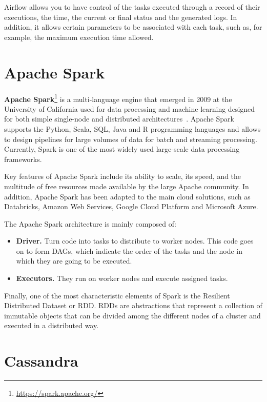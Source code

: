 \nonzeroparskip Airflow allows you to have control of the tasks executed through a record of their executions, the time, the current or final status and the generated logs. In addition, it allows certain parameters to be associated with each task, such as, for example, the maximum execution time allowed.

\section{Apache Spark}

\nonzeroparskip \textbf{Apache Spark}\footnote{\url{https://spark.apache.org/}} is a multi-language engine that emerged in 2009 at the University of California used for data processing and machine learning designed for both simple single-node and distributed architectures~\cite{infoworld_spark}. Apache Spark supports the Python, Scala, SQL, Java and R programming languages and allows to design pipelines for large volumes of data for batch and streaming processing. Currently, Spark is one of the most widely used large-scale data processing frameworks.

\nonzeroparskip Key features of Apache Spark include its ability to scale, its speed, and the multitude of free resources made available by the large Apache community. In addition, Apache Spark has been adapted to the main cloud solutions, such as Databricks, Amazon Web Services, Google Cloud Platform and Microsoft Azure.

\nonzeroparskip The Apache Spark architecture is mainly composed of:
\begin{itemize}
	\item \textbf{Driver.} Turn code into tasks to distribute to worker nodes. This code goes on to form DAGs, which indicate the order of the tasks and the node in which they are going to be executed.
	\item \textbf{Executors.} They run on worker nodes and execute assigned tasks.
\end{itemize}

\nonzeroparskip Finally, one of the most characteristic elements of Spark is the Resilient Distributed Dataset or RDD. RDDs are abstractions that represent a collection of immutable objects that can be divided among the different nodes of a cluster and executed in a distributed way.

\section{Cassandra}

